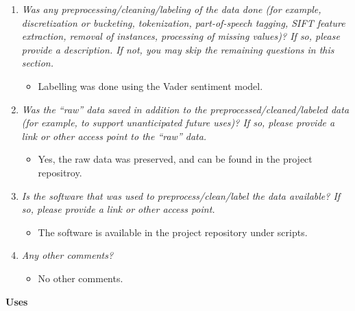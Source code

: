 \documentclass[
]{article}
\providecommand{\tightlist}{%
  \setlength{\itemsep}{0pt}\setlength{\parskip}{0pt}}
\begin{document}
\begin{enumerate}
\def\labelenumi{\arabic{enumi}.}
\tightlist
\item
  \emph{Was any preprocessing/cleaning/labeling of the data done (for example, discretization or bucketing, tokenization, part-of-speech tagging, SIFT feature extraction, removal of instances, processing of missing values)? If so, please provide a description. If not, you may skip the remaining questions in this section.}

  \begin{itemize}
  \tightlist
  \item
    Labelling was done using the Vader sentiment model.
  \end{itemize}
\item
  \emph{Was the ``raw'' data saved in addition to the preprocessed/cleaned/labeled data (for example, to support unanticipated future uses)? If so, please provide a link or other access point to the ``raw'' data.}

  \begin{itemize}
  \tightlist
  \item
    Yes, the raw data was preserved, and can be found in the project repositroy.
  \end{itemize}
\item
  \emph{Is the software that was used to preprocess/clean/label the data available? If so, please provide a link or other access point.}

  \begin{itemize}
  \tightlist
  \item
    The software is available in the project repository under scripts.
  \end{itemize}
\item
  \emph{Any other comments?}

  \begin{itemize}
  \tightlist
  \item
    No other comments.
  \end{itemize}
\end{enumerate}

\textbf{Uses}
\end{document}
